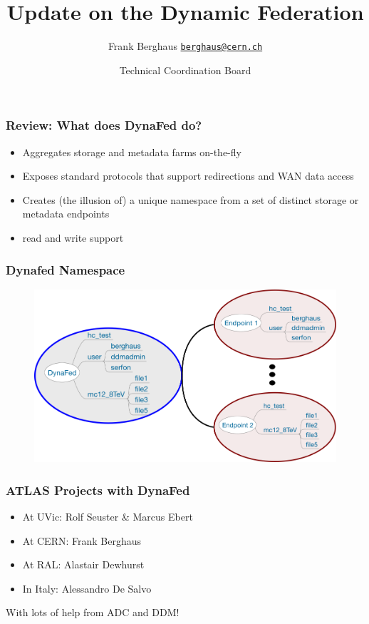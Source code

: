 \documentclass{beamer}
\title{Update on the Dynamic Federation}
\date[ISPN ’80]{Technical Coordination Board}
\author[Euclid]{Frank Berghaus \href{mailto:berghaus@cern.ch}{\texttt{berghaus@cern.ch}}}
\begin{document}
\begin{frame}
\titlepage
\end{frame}


\begin{frame}
\frametitle{Review: What does DynaFed do?}
\begin{itemize}
\item Aggregates storage and metadata farms on-the-fly
\item Exposes standard protocols that support redirections and WAN data access
\item Creates (the illusion of) a unique namespace from a set of distinct storage or metadata endpoints
\item read and write support
\end{itemize}
\end{frame}

\begin{frame}
  \frametitle{Dynafed Namespace}
  \begin{figure}
      \centering
      \includegraphics[width=\columnwidth]{dynafed-namespaces.png}
  \end{figure}
\end{frame}

\begin{frame}
  \frametitle{ATLAS Projects with DynaFed}
  \begin{itemize}
    \item At UVic: Rolf Seuster \& Marcus Ebert
    \item At CERN: Frank Berghaus
    \item At RAL: Alastair Dewhurst
    \item In Italy: Alessandro De Salvo
  \end{itemize}
  With lots of help from ADC and DDM!
\end{frame}
\end{document}
